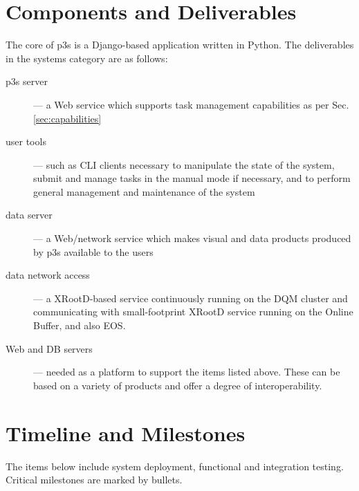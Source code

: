 \documentclass[pdftex,12pt,letter]{article}
\begin{document}
\section{Components and Deliverables}

The core of p3s is a Django-based \cite{django} application written in Python. The
deliverables in the systems category are as follows:

\begin{description}
\item[p3s server] --- a Web service which supports task management capabilities as per Sec.\,\ref{sec:capabilities}

\item[user tools] --- such as CLI clients necessary to manipulate the state of the system, submit
and manage tasks in the manual mode if necessary, and to perform general management and
maintenance of the system

\item[data server] --- a Web/network service which makes visual and data products produced by p3s
available to the users

\item[data network access] --- a XRootD-based service continuously running on the DQM cluster
and communicating with small-footprint XRootD service running on the Online Buffer, and also EOS.

\item[Web and DB servers] --- needed as a platform to support the items listed above. These
can be based on a variety of products and offer a degree of interoperability.

\end{description}

\noindent 

\section{Timeline and Milestones}

The items below include system deployment, functional and integration testing.
Critical milestones are marked by bullets.
\end{document}
